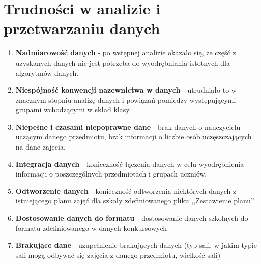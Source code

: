 \section{Trudności w analizie i przetwarzaniu danych}
\begin{enumerate}
\item \textbf{Nadmiarowość danych} - po wstępnej analizie okazało się, że część z uzyskanych danych nie jest potrzeba do wyodrębniania istotnych dla algorytmów danych.
\item \textbf{Niespójność konwencji nazewnictwa w danych} - utrudniało to w znacznym stopniu analizę danych i powiązań pomiędzy występującymi grupami wchodzącymi w skład klasy.
\item \textbf{Niepełne i czasami niepoprawne dane} - brak danych o nauczycielu uczącym danego przedmiotu, brak informacji o liczbie osób uczęszczających na dane zajęcia.
\item \textbf{Integracja danych} - konieczność łączenia danych w celu wyodrębnienia informacji o poszczególnych przedmiotach i grupach uczniów.
\item \textbf{Odtworzenie danych} - konieczność odtworzenia niektórych danych z istniejącego planu zajęć dla szkoły zdefiniowanego pliku ,,Zestawienie planu''
\item \textbf{Dostosowanie danych do formatu} - dostosowanie danych szkolnych do formatu zdefiniowanego w danych konkursowych
\item \textbf{Brakujące dane} - uzupełnienie brakujących danych (typ sali, w jakim typie sali mogą odbywać się zajęcia z danego przedmiotu, wielkość sali)
\end{enumerate}


